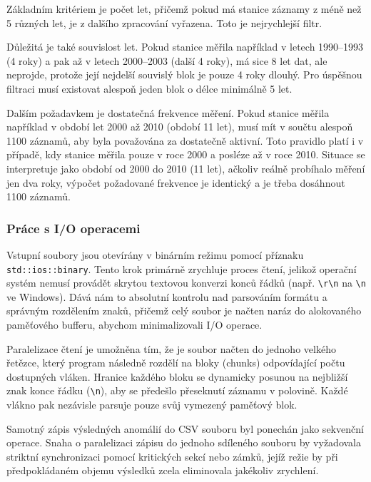 \documentclass[10pt, a4paper]{report}
\begin{document}
	Základním kritériem je počet let, přičemž pokud má stanice záznamy z méně než 5 různých let, je z dalšího zpracování vyřazena. Toto je nejrychlejší filtr.
	
	Důležitá je také souvislost let. Pokud stanice měřila například v letech 1990–1993 (4 roky) a pak až v letech 2000–2003 (další 4 roky), má sice 8 let dat, ale neprojde, protože její nejdelší souvislý blok je pouze 4 roky dlouhý. Pro úspěšnou filtraci musí existovat alespoň jeden blok o délce minimálně 5 let.
	
	Dalším požadavkem je dostatečná frekvence měření. Pokud stanice měřila například v období let 2000 až 2010 (období 11 let), musí mít v součtu alespoň 1100 záznamů, aby byla považována za dostatečně aktivní. Toto pravidlo platí i v případě, kdy stanice měřila pouze v roce 2000 a posléze až v roce 2010. Situace se interpretuje jako období od 2000 do 2010 (11 let), ačkoliv reálně probíhalo měření jen dva roky, výpočet požadované frekvence je identický a je třeba dosáhnout 1100 záznamů.
	
	\subsubsection{Práce s I/O operacemi} \label{rozhodnuti:io}
	
	Vstupní soubory jsou otevírány v binárním režimu pomocí příznaku \texttt{std::ios::binary}. Tento krok primárně zrychluje proces čtení, jelikož operační systém nemusí provádět skrytou textovou konverzi konců řádků (např. \texttt{\textbackslash r\textbackslash n} na \texttt{\textbackslash n} ve Windows). Dává nám to absolutní kontrolu nad parsováním formátu a správným rozdělením znaků, přičemž celý soubor je načten naráz do alokovaného paměťového bufferu, abychom minimalizovali I/O operace.
	
	Paralelizace čtení je umožněna tím, že je soubor načten do jednoho velkého řetězce, který program následně rozdělí na bloky (chunks) odpovídající počtu dostupných vláken. Hranice každého bloku se dynamicky posunou na nejbližší znak konce řádku (\texttt{\textbackslash n}), aby se předešlo přeseknutí záznamu v polovině. Každé vlákno pak nezávisle parsuje pouze svůj vymezený paměťový blok.
	
	Samotný zápis výsledných anomálií do CSV souboru byl ponechán jako sekvenční operace. Snaha o paralelizaci zápisu do jednoho sdíleného souboru by vyžadovala striktní synchronizaci pomocí kritických sekcí nebo zámků, jejíž režie by při předpokládaném objemu výsledků zcela eliminovala jakékoliv zrychlení.
	
\end{document}
